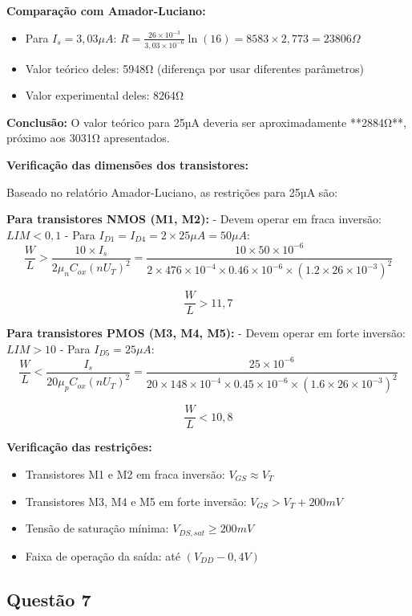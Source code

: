 \documentclass[12pt,a4paper]{article}
\begin{document}
\textbf{Comparação com Amador-Luciano:}
\begin{itemize}
    \item Para $I_s = 3,03\mu A$: $R = \frac{26 \times 10^{-3}}{3,03 \times 10^{-6}} \ln(16) = 8583 \times 2,773 = 23806\Omega$ 
    \item Valor teórico deles: 5948Ω (diferença por usar diferentes parâmetros)
    \item Valor experimental deles: 8264Ω
\end{itemize}

\textbf{Conclusão:} O valor teórico para 25µA deveria ser aproximadamente **2884Ω**, próximo aos 3031Ω apresentados.

\textbf{Verificação das dimensões dos transistores:}

Baseado no relatório Amador-Luciano, as restrições para 25µA são:

\textbf{Para transistores NMOS (M1, M2):} 
- Devem operar em fraca inversão: $LIM < 0,1$
- Para $I_{D1} = I_{D4} = 2 \times 25\mu A = 50\mu A$:
$$\frac{W}{L} > \frac{10 \times I_s}{2\mu_n C_{ox} (nU_T)^2} = \frac{10 \times 50 \times 10^{-6}}{2 \times 476 \times 10^{-4} \times 0.46 \times 10^{-6} \times (1.2 \times 26 \times 10^{-3})^2}$$

$$\frac{W}{L} > 11,7$$

\textbf{Para transistores PMOS (M3, M4, M5):}
- Devem operar em forte inversão: $LIM > 10$
- Para $I_{D5} = 25\mu A$:
$$\frac{W}{L} < \frac{I_s}{20\mu_p C_{ox} (nU_T)^2} = \frac{25 \times 10^{-6}}{20 \times 148 \times 10^{-4} \times 0.45 \times 10^{-6} \times (1.6 \times 26 \times 10^{-3})^2}$$

$$\frac{W}{L} < 10,8$$

\textbf{Verificação das restrições:}
\begin{itemize}
    \item Transistores M1 e M2 em fraca inversão: $V_{GS} \approx V_T$
    \item Transistores M3, M4 e M5 em forte inversão: $V_{GS} > V_T + 200mV$
    \item Tensão de saturação mínima: $V_{DS,sat} \geq 200mV$
    \item Faixa de operação da saída: até $(V_{DD} - 0,4V)$
\end{itemize}

\subsection*{Questão 7}
\end{document}
